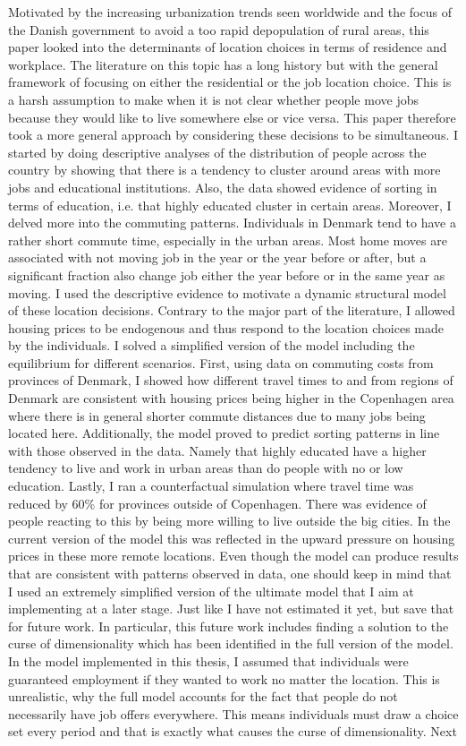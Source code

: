 Motivated by the increasing urbanization trends seen worldwide and the focus of the Danish government to avoid a too rapid depopulation of rural areas, this paper looked into the determinants of location choices in terms of residence and workplace. The literature on this topic has a long history but with the general framework of focusing on either the residential or the job location choice. This is a harsh assumption to make when it is not clear whether people move jobs because they would like to live somewhere else or vice versa. This paper therefore took a more general approach by considering these decisions to be simultaneous. I started by doing descriptive analyses of the distribution of people across the country by showing that there is a tendency to cluster around areas with more jobs and educational institutions. Also, the data showed evidence of sorting in terms of education, i.e. that highly educated cluster in certain areas. Moreover, I delved more into the commuting patterns. Individuals in Denmark tend to have a rather short commute time, especially in the urban areas. Most home moves are associated with not moving job in the year or the year before or after, but a significant fraction also change job either the year before or in the same year as moving. I used the descriptive evidence to motivate a dynamic structural model of these location decisions. Contrary to the major part of the literature, I allowed housing prices to be endogenous and thus respond to the location choices made by the individuals. I solved a simplified version of the model including the equilibrium for different scenarios. First, using data on commuting costs from provinces of Denmark, I showed how different travel times to and from regions of Denmark are consistent with housing prices being higher in the Copenhagen area where there is in general shorter commute distances due to many jobs being located here. Additionally, the model proved to predict sorting patterns in line with those observed in the data. Namely that highly educated have a higher tendency to live and work in urban areas than do people with no or low education. Lastly, I ran a counterfactual simulation where travel time was reduced by 60\% for provinces outside of Copenhagen. There was evidence of people reacting to this by being more willing to live outside the big cities. In the current version of the model this was reflected in the upward pressure on housing prices in these more remote locations. Even though the model can produce results that are consistent with patterns observed in data, one should keep in mind that I used an extremely simplified version of the ultimate model that I aim at implementing at a later stage. Just like I have not estimated it yet, but save that for future work. In particular, this future work includes finding a solution to the curse of dimensionality which has been identified in the full version of the model. In the model implemented in this thesis, I assumed that individuals were guaranteed employment if they wanted to work no matter the location. This is unrealistic, why the full model accounts for the fact that people do not necessarily have job offers everywhere. This means individuals must draw a choice set every period and that is exactly what causes the curse of dimensionality. Next 